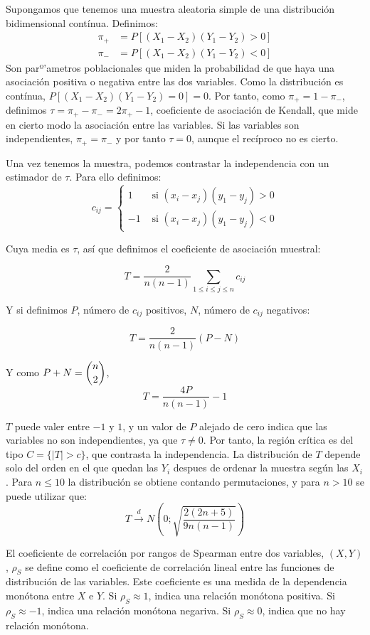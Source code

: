 
Supongamos que tenemos una muestra aleatoria simple de una distribuci\'on bidimensional cont\'inua. Definimos:
\begin{align*}
\pi_{+}&=P[(X_1-X_2)(Y_1-Y_2)>0] \\
\pi_{-}&=P[(X_1-X_2)(Y_1-Y_2)<0] 
\end{align*}
Son parº'ametros poblacionales que miden la probabilidad de que haya una asociaci\'on positiva o negativa entre las dos variables. Como la distribuci\'on es cont\'inua, $P[(X_1-X_2)(Y_1-Y_2)=0]=0$. Por tanto, como $\pi_+=1-\pi_-$, definimos $\tau=\pi_+-\pi_-=2\pi_+-1$, coeficiente de asociaci\'on de Kendall, que mide en cierto modo la asociaci\'on entre las variables. Si las variables son independientes, $\pi_+=\pi_-$ y por tanto $\tau=0$, aunque el rec\'iproco no es cierto.

Una vez tenemos la muestra, podemos contrastar la independencia con un estimador de $\tau$. Para ello definimos:
\[c_{ij}=\left\{\begin{matrix}
1 & \text{  si  } (x_i-x_j)(y_1-y_j)>0 \\
-1 & \text{  si  } (x_i-x_j)(y_1-y_j)<0 
\end{matrix}\right.\]

Cuya media es $\tau$, as\'i que definimos el coeficiente de asociaci\'on muestral:

\[T=\dfrac{2}{n(n-1)}\sum_{1\leq i\leq j\leq n}c_{ij}\]

Y si definimos $P$, n\'umero de $c_{ij}$ positivos, $N$, n\'umero de $c_{ij}$ negativos:

\[T=\dfrac{2}{n(n-1)}(P-N)\]

Y como $P+N=\dbinom{n}{2}$,
\[T=\dfrac{4P}{n(n-1)}-1\]

$T$ puede valer entre $-1$ y $1$, y un valor de $P$ alejado de cero indica que las variables no son independientes, ya que $\tau\neq0$. Por tanto, la regi\'on cr\'itica es del tipo $C=\{|T|>c\}$, que contrasta la independencia. La distribuci\'on de $T$ depende solo del orden en el que quedan las $Y_i$ despues de ordenar la muestra seg\'un las $X_i$. Para $n\leq10$ la distribuci\'on se obtiene contando permutaciones, y para $n>10$ se puede utilizar que:
\[T\overset{d}{\to}N\left(0;\sqrt{\dfrac{2(2n+5)}{9n(n-1)}}\right)\]


El coeficiente de correlaci\'on por rangos de Spearman entre dos variables, $(X,Y)$, $\rho_S$ se define como el coeficiente de correlaci\'on lineal entre las funciones de distribuci\'on de las variables. Este coeficiente es una medida de la dependencia mon\'otona entre $X$ e $Y$. Si $\rho_S\approx1$, indica una relaci\'on mon\'otona positiva. Si $\rho_S\approx-1$, indica una relaci\'on mon\'otona negariva. Si $\rho_S\approx0$, indica que no hay relaci\'on mon\'otona.

